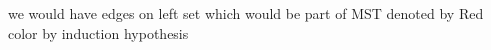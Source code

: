 \documentclass[preview]{standalone}
\begin{document}
\begin{center}
we would have edges on left set which would be part of MST denoted by Red color by induction hypothesis
\end{center}
\end{document}
